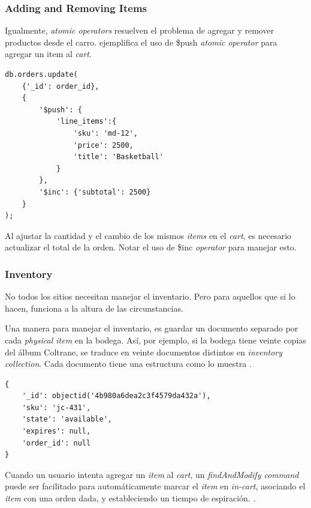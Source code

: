  
\subsubsection*{Adding and Removing Items}

Igualmente, \textit{atomic operators} resuelven el problema de agregar y remover productos desde el carro.  ejemplifica el uso de \$push \textit{atomic operator} para agregar un item al \textit{cart}.

\begin{lstlisting}[caption= Ejemplo del operador \$push., label=source:javascript:example_push_operator_mongodb]
db.orders.update(
	{'_id': order_id},
    {
    	'$push': {
    		'line_items':{
    			'sku': 'md-12',
    			'price': 2500,
    			'title': 'Basketball'
    		}
    	},
    	'$inc': {'subtotal': 2500}
    }
);
\end{lstlisting}

Al ajustar la cantidad y el cambio de los mismos \textit{items} en el \textit{cart}, es necesario actualizar el total de la orden. Notar el uso de \$inc \textit{operator} para manejar esto.

\subsubsection{Inventory}

No todos los sitios \ecommerce necesitan manejar el inventario. Pero para aquellos que si lo hacen,  funciona a la altura de las circunstancias.

Una manera para manejar el inventario, es guardar un documento separado por cada \textit{physical item} en la bodega. Así, por ejemplo, si la bodega tiene veinte copias del álbum Coltrane, se traduce en veinte documentos distintos en \textit{inventory collection}. Cada documento tiene una estructura como lo muestra .

\begin{lstlisting}[caption= Ejemplo de documento para un \textit{item}., label=source:javascript:example_document_inventory_mongodb]
{
	'_id': objectid('4b980a6dea2c3f4579da432a'),
	'sku': 'jc-431',
	'state': 'available',
	'expires': null,
	'order_id': null
}
\end{lstlisting}


Cuando un usuario intenta agregar un \textit{item} al \textit{cart}, un \textit{findAndModify command} puede ser facilitado para automáticamente marcar el \textit{item} en \textit{in-cart}, asociando el \textit{item} con una orden dada, y estableciendo un tiempo de espiración. .

